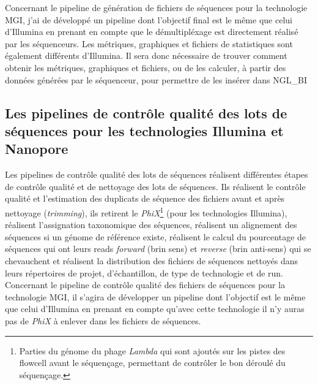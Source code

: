 Concernant le pipeline de génération de fichiers de séquences pour la technologie MGI, j'ai de développé un pipeline dont l'objectif final est le même que celui d'Illumina en prenant en compte que le démultipléxage est directement réalisé par les séquenceurs. Les métriques, graphiques et fichiers de statistiques sont également différents d'Illumina. Il sera donc nécessaire de trouver comment obtenir les métriques, graphiques et fichiers, ou de les calculer, à partir des données générées par le séquenceur, pour permettre de les insérer dans NGL\_BI

\subsection{Les pipelines de contrôle qualité des lots de séquences pour les technologies Illumina et Nanopore}
Les pipelines de contrôle qualité des lots de séquences réalisent différentes étapes de contrôle qualité et de nettoyage des lots de séquences. Ils réalisent le contrôle qualité et l'estimation des duplicats de séquence des fichiers avant et après nettoyage (\emph{trimming}), ils retirent le \emph{PhiX}\footnote{Parties du génome du phage \emph{Lambda} qui sont ajoutés sur les pistes des flowcell avant le séquençage, permettant de contrôler le bon déroulé du séquençage.} (pour les technologies Illumina), réalisent l'assignation taxonomique des séquences, réalisent un alignement des séquences si un génome de référence existe, réalisent le calcul du pourcentage de séquences qui ont leurs reads \emph{forward} (brin sens) et \emph{reverse} (brin anti-sens) qui se chevauchent et réalisent la distribution des fichiers de séquences nettoyés dans leurs répertoires de projet, d'échantillon, de type de technologie et de run.\\

Concernant le pipeline de contrôle qualité des fichiers de séquences pour la technologie MGI, il s'agira de développer un pipeline dont l'objectif est le même que celui d'Illumina en prenant en compte qu'avec cette technologie il n'y auras pas de \emph{PhiX} à enlever dans les fichiers de séquences.
